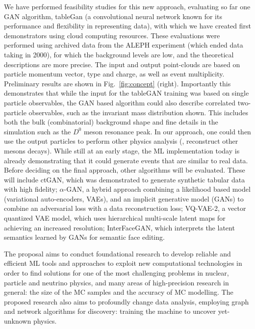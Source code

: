 We have performed feasibility studies for this new approach, evaluating so far one GAN algorithm, tableGan (a convolutional neural network known for its performance and flexibility in representing data), with which we have created first demonstrators using cloud computing resources. These evaluations were performed using {\eecol} archived data from the ALEPH experiment (which ended data taking in 2000), for which the background levels are low, and the theoretical descriptions are more precise. The input and output point-clouds are based on particle momentum vector,  type and charge, as well as event multiplicity. Preliminary results are shown in Fig.~\ref{fig:concept} (right). Importantly this demonstrates that while the input for the tableGAN training was based on single particle observables, the GAN based algorithm could also describe correlated two-particle observables, such as the invariant mass distribution shown. This includes both the bulk (combinatorial) background shape and fine details in the simulation such as the $D^0$ meson resonance peak. In our approach, one could then use the output particles to perform other physics analysis (\eg, reconstruct other mesons decays). While still at an early stage, the ML implementation today is already demonstrating that it could generate {\eecol} events that are similar to real data. Before deciding on the final approach, other algorithms will be evaluated. These will include ctGAN, which was demonstrated to generate synthetic tabular data with high fidelity; $\alpha$-GAN, a hybrid approach combining a likelihood based model (variational auto-encoders, VAEs), and an implicit generative model (GANs) to combine an adversarial loss with a data reconstruction loss; VQ-VAE-2, a vector quantized VAE model, which uses hierarchical multi-scale latent maps for achieving an increased resolution; InterFaceGAN, which interprets the latent semantics learned by GANs for semantic face editing. 

The proposal aims to conduct foundational research to develop reliable and efficient ML tools and approaches to exploit new computational technologies in order to find solutions for one of the most challenging problems in nuclear, particle and neutrino physics, and many areas of high-precision research in general: the size of the MC samples and the accuracy of MC modelling. The proposed research  also aims to profoundly change data analysis, employing graph and network algorithms for discovery: training the machine to uncover yet-unknown physics.
\clearpage


